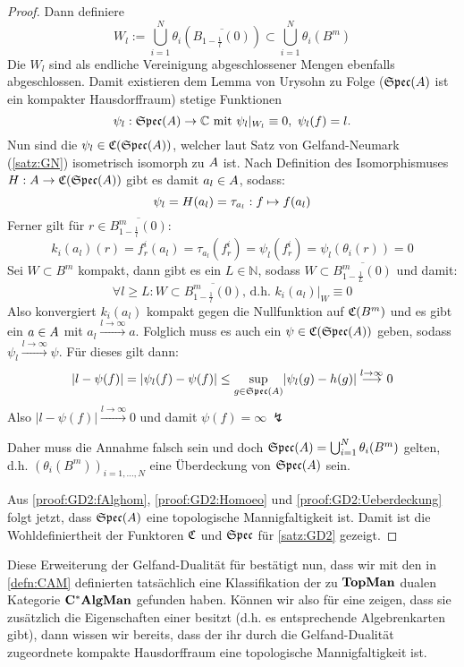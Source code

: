 \begin{proof}
Dann definiere 
\[W_l := \bigcup_{i=1}^N \theta_i(\overline{B_{1-\frac{1}{l}}(0)}) \subset \bigcup_{i=1}^N \theta_i(B^m)\]
Die $W_l$ sind als endliche Vereinigung abgeschlossener Mengen ebenfalls abgeschlossen. Damit existieren dem Lemma von Urysohn zu Folge ($\mathfrak{Spec}(A)$ ist ein kompakter Hausdorffraum) stetige Funktionen
\[\psi_l: \mathfrak{Spec}(A) \to \mathbb{C} \text{ mit } \psi_l|_{W_l} \equiv 0, ~\psi_l(f) = l.\]
Nun sind die $\psi_l \in \mathfrak{C}(\mathfrak{Spec}(A))$, welcher laut Satz von Gelfand-Neumark (\cref{satz:GN}) isometrisch isomorph zu $A$ ist. Nach Definition des Isomorphismuses $H: A \to  \mathfrak{C}(\mathfrak{Spec}(A))$ gibt es damit $a_l \in A$, sodass:
\[\psi_l = H(a_l) = \tau_{a_l}: f \mapsto f(a_l)\]
Ferner gilt für $r \in \overline{B_{1-\frac{1}{l}}^m(0)}$:
\[k_i(a_l)(r) = f_r^i(a_l) = \tau_{a_l}(f_r^i) = \psi_l(f_r^i) = \psi_l(\theta_i(r)) = 0\]
Sei $W \subset B^m$ kompakt, dann gibt es ein $L \in \mathbb{N}$, sodass $W \subset \overline{B_{1-\frac{1}{L}}^m(0)}$ und damit:
\[\forall l \geq L: W \subset \overline{B_{1-\frac{1}{l}}^m(0)} \text{, d.h. } k_i(a_l)|_W \equiv 0\]
Also konvergiert $k_i(a_l)$ kompakt gegen die Nullfunktion auf $\mathfrak{C}(B^m)$ und es gibt ein $a \in A$ mit $a_l \overset{l \to \infty}{\longrightarrow} a$. Folglich muss es auch ein $\psi \in \mathfrak{C}(\mathfrak{Spec}(A))$ geben, sodass $\psi_l \overset{l \to \infty}{\longrightarrow} \psi$. Für dieses gilt dann:
\[|l - \psi(f)| = |\psi_l(f) - \psi(f)| \leq \underset{g \in \mathfrak{Spec}(A)}{\sup}|\psi_l(g) - h(g)| \overset{l \to \infty}{\longrightarrow} 0 \]
Also $|l - \psi(f)| \overset{l \to \infty}{\longrightarrow} 0$ und damit $\psi(f) = \infty ~\lightning$

Daher muss die Annahme falsch sein und doch $\mathfrak{Spec}(A) = \bigcup_{i=1}^N \theta_i(B^m)$ gelten, d.h. $(\theta_i(B^m))_{i=1,\dots,N}$ eine Überdeckung von $\mathfrak{Spec}(A)$ sein.

Aus \ref{proof:GD2:fAlghom}, \ref{proof:GD2:Homoeo} und \ref{proof:GD2:Ueberdeckung} folgt jetzt, dass $\mathfrak{Spec}(A)$ eine topologische Mannigfaltigkeit ist. Damit ist die Wohldefiniertheit der Funktoren $\mathfrak{C}$ und $\mathfrak{Spec}$ für \cref{satz:GD2} gezeigt.
\end{proof}

Diese Erweiterung der Gelfand-Dualität für \komTopMann{} bestätigt nun, dass wir mit den in \cref{defn:CAM} definierten \CAlgMann{} tatsächlich eine Klassifikation der zu $\mathbf{TopMan}$ dualen Kategorie $\mathbf{C^*AlgMan}$ gefunden haben. Können wir also für eine \CAlg{} zeigen, dass sie zusätzlich die Eigenschaften einer \CAlgMan{} besitzt (d.h. es entsprechende Algebrenkarten gibt), dann wissen wir bereits, dass der ihr durch die Gelfand-Dualität zugeordnete kompakte Hausdorffraum eine topologische Mannigfaltigkeit ist.